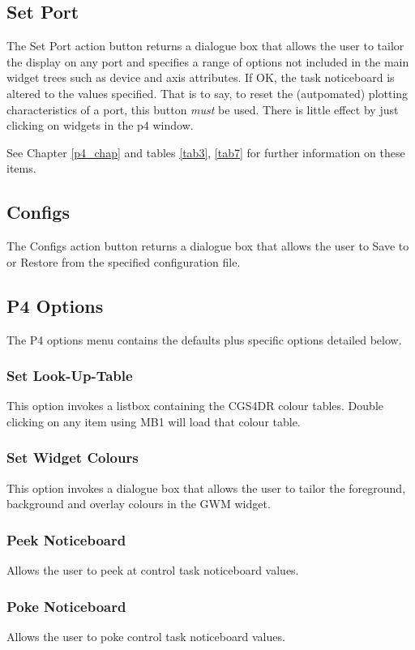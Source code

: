 \documentclass[a4paper]{book}
\renewcommand{\_}{{\tt\char'137}}
\begin{document}
\subsection{Set Port}
The {\sf Set Port} action button returns a dialogue box that
allows the user to tailor the display on any port and specifies a range of
options not included in the main widget trees such as device and axis attributes. If OK, the 
task noticeboard is altered to the values specified. That is to say, to reset the (autpomated)
plotting characteristics of a port, this button {\em must} be used. There is little effect
by just clicking on widgets in the p4 window.

See Chapter \ref{p4_chap} and tables
\ref{tab3}, \ref{tab7} for further information on these items.

\subsection{Configs}
The {\sf Configs} action button returns a dialogue box that
allows the user to {\sf Save} to or {\sf Restore} from the specified configuration
file. 

\subsection{P4 Options}
The P4 options menu contains the defaults plus specific options detailed below.

\subsubsection{Set Look-Up-Table}
This option invokes a listbox containing the CGS4DR colour tables. Double clicking
on any item using MB1 will load that colour table.

\subsubsection{Set Widget Colours}
This option invokes a dialogue box that allows the user to tailor the foreground,
background and overlay colours in the GWM widget.

\subsubsection{Peek Noticeboard}
Allows the user to peek at control task noticeboard values.

\subsubsection{Poke Noticeboard}
Allows the user to poke control task noticeboard values.
\end{document}
